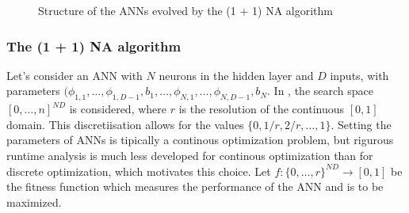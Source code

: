 \begin{figure}
    \begin{center}
        \caption{Structure of the ANNs evolved by the (1 + 1) NA algorithm}
        \label{fig:oneplusonena_ann}
    \end{center}
\end{figure}

\subsubsection{The (1 + 1) NA algorithm}

Let's consider an ANN with $N$ neurons in the hidden layer and $D$ inputs, with parameters
$(\phi_{1,1}, \dots, \phi_{1,D-1}, b_1, \dots, \phi_{N,1}, \dots, \phi_{N,D-1}, b_N$.
In \cite{na}, the search space $[0 , \dots, n]^{N D}$ is considered, where $r$ is the resolution of the continuous $[0, 1]$ domain.
This discretiisation allows for the values $\{0, 1/r, 2/r, \dots, 1\}$. Setting the parameters of ANNs is tipically a continous optimization problem,
but rigurous runtime analysis is much less developed for continous optimization than for discrete optimization, which motivates this choice.
Let $f : \{0 , \dots, r\}^{N D} \to [0, 1]$ be the fitness function which measures the performance of the ANN and is to be maximized.

